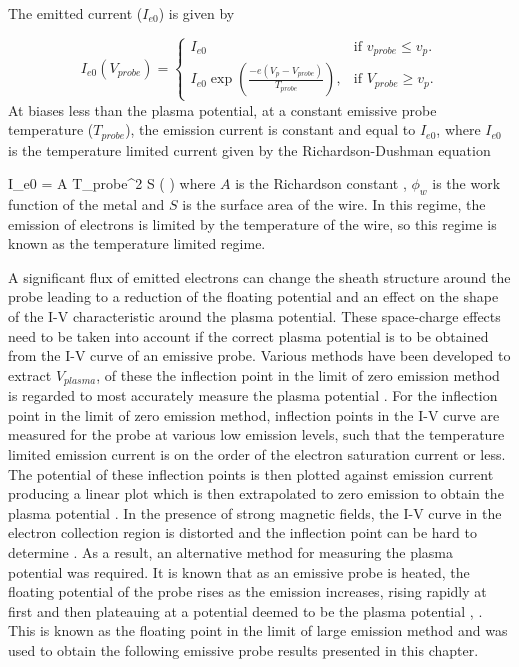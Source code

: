 The emitted current ($I_{e0}$) is given by 


\begin{equation}
 I_{e0} (V_{probe}) =    \begin{cases}
   I_{e0}  & \text{if $v_{probe} \leq v_p$}.\\
      I_{e0} \exp \left (\frac{-e(V_p - V_{probe})}{T_{probe}} \right), & \text{if $V_{probe} \geq v_p$}.
  \end{cases}
\end{equation}
At biases less than the plasma potential, at a constant emissive probe temperature ($T_{probe}$), the emission current is constant and equal to $I_{e0}$, where $I_{e0}$ is the temperature limited current given by the Richardson-Dushman equation \cite{emissionya}

\be 
I_{e0} = A {T_{probe}}^2 S \exp \left(  \right)
\ee where $A$ is the Richardson constant , $\phi_w$ is the work function of the metal and $S$ is the surface area of the wire. In this regime, the emission of electrons is limited by the temperature of the wire, so this regime is known as the temperature limited regime.

A significant flux of emitted electrons can change the sheath structure around the probe leading to a reduction of the floating potential and an effect on the shape of the I-V characteristic around the plasma potential. These space-charge effects need to be taken into account if the correct plasma potential is to be obtained from the I-V curve of an emissive probe. Various methods have been developed to extract $V_{plasma}$, of these the inflection point in the limit of zero emission method is regarded to most accurately measure the plasma potential \cite{embest}. For the inflection point in the limit of zero emission method, inflection points in the I-V curve are measured for the probe at various low emission levels, such that the temperature limited emission current is on the order of the electron saturation current or less. The potential of these inflection points is then plotted against emission current producing a linear plot which is then extrapolated to zero emission to obtain the plasma potential \cite{inflection}. In the presence of strong magnetic fields, the I-V curve in the electron collection region is distorted and the inflection point can be hard to determine \cite{inflection}. As a result, an alternative method for measuring the plasma potential was required. It is known that as an emissive probe is heated, the floating potential of the probe rises as the emission increases, rising rapidly at first and then plateauing at a potential deemed to be the plasma potential \cite{review_em}, \cite{bradley}. This is known as the floating point in the limit of large emission method and was used to obtain the following emissive probe results presented in this chapter. 

